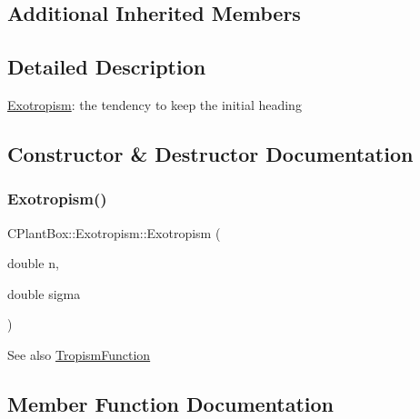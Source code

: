 \subsection*{Additional Inherited Members}


\subsection{Detailed Description}
\hyperlink{classCPlantBox_1_1Exotropism}{Exotropism}\+: the tendency to keep the initial heading 

\subsection{Constructor \& Destructor Documentation}
\mbox{\label{classCPlantBox_1_1Exotropism_af2dd84113a9f66b735f5df62e658f01b}} 
\subsubsection{\texorpdfstring{Exotropism()}{Exotropism()}}
{\footnotesize\ttfamily C\+Plant\+Box\+::\+Exotropism\+::\+Exotropism (\begin{DoxyParamCaption}\item[{double}]{n,  }\item[{double}]{sigma }\end{DoxyParamCaption})\hspace{0.3cm}{\ttfamily [inline]}}

\begin{DoxySeeAlso}{See also}
\hyperlink{classCPlantBox_1_1TropismFunction}{Tropism\+Function} 
\end{DoxySeeAlso}


\subsection{Member Function Documentation}
\mbox{\label{classCPlantBox_1_1Exotropism_a2049c4f5a375d90c05e9995df2e01542}} 

